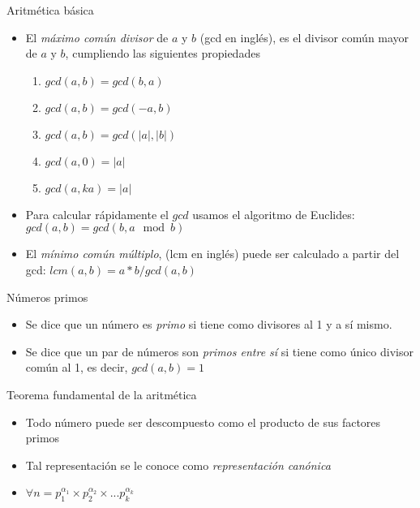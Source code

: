 \documentclass[]{beamer}
\begin{document}
\begin{frame}{Aritm\'etica b\'asica}
  \begin{itemize}
    \item El \textit{m\'aximo com\'un divisor} de $a$ y $b$ (gcd en ingl\'es), es el divisor com\'un mayor de $a$ y $b$, cumpliendo las siguientes propiedades
      \pause
      \begin{enumerate}
        \item $gcd(a,b) = gcd(b,a)$
          \pause
        \item $gcd(a,b) = gcd(-a,b)$
          \pause
        \item $gcd(a,b) = gcd(|a|, |b|)$
          \pause
        \item $gcd(a, 0) = |a|$
          \pause
        \item $gcd(a, ka) = |a|$
      \end{enumerate}
      \pause
    \item Para calcular r\'apidamente el $gcd$ usamos el algoritmo de Euclides: $gcd(a,b) = gcd(b, a \mod b)$
      \pause
    \item El \textit{m\'inimo com\'un m\'ultiplo}, (lcm en ingl\'es) puede ser calculado a partir del gcd: $lcm(a,b) = a*b/gcd(a,b)$
  \end{itemize}
\end{frame}

\begin{frame}{N\'umeros primos}
  \begin{itemize}
    \item Se dice que un n\'umero es \textit{primo} si tiene como divisores al 1 y a s\'i mismo.
      \pause
    \item Se dice que un par de n\'umeros son \textit{primos entre s\'i} si tiene como \'unico divisor com\'un al 1, es decir, $gcd(a,b) = 1$
  \end{itemize}
\end{frame}

\begin{frame}{Teorema fundamental de la aritm\'etica}
  \begin{itemize}
    \item Todo n\'umero puede ser descompuesto como el producto de sus factores primos
      \pause
    \item Tal representaci\'on se le conoce como \textit{representaci\'on can\'onica}
      \pause
    \item $\forall n = p_1^{\alpha_1} \times p_2^{\alpha_2} \times ... p_k^{\alpha_k}$
  \end{itemize}
\end{frame}
\end{document}
